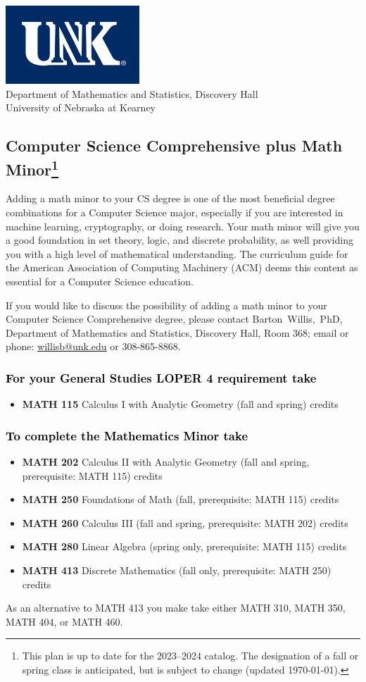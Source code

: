 \documentclass[10pt]{article}
\makeatletter
\newenvironment{mypar}[2]
   {\begin{list}{}%
     {\setlength\leftmargin{#1}
     \setlength\rightmargin{#2}}
     \item[]}
   {\end{list}}
\newcommand{\calcone}{\textbf{MATH 115} Calculus I with Analytic Geometry (fall and spring) \dotfill 5 credits}
\newcommand{\calctwo}{\textbf{MATH 202} Calculus II with Analytic Geometry (fall and spring, prerequisite: MATH 115) \dotfill 5 credits }
\newcommand{\foundations}{\textbf{MATH 250} Foundations of Math (fall, prerequisite: MATH 115)  \dotfill 3 credits}
\newcommand{\calcthree}{\textbf{MATH 260} Calculus III  (fall and spring, prerequisite: MATH 202) \dotfill 5 credits}
\newcommand{\linear}{\textbf{MATH 280} Linear Algebra (spring only, prerequisite: MATH 115) \dotfill 3 credits}
\newcommand{\discrete}{\textbf{MATH 413} Discrete Mathematics  (fall only, prerequisite: MATH 250)\dotfill 3 credits}
\newcommand{\discreteshort}{MATH 413}
\newcommand{\abstractalgebrashort}{MATH 350}
\newcommand{\advancedcalcshort}{MATH 460}
\newcommand{\collegegeometryshort}{MATH 310}
\newcommand{\numbertheoryshort}{MATH 404}
\newcommand{\contactbw}{\mbox{Barton Willis, PhD}, Department of Mathematics and Statistics,  Discovery Hall, Room 368;
email or phone: \href{mailto:willisb@unk.edu}{willisb@unk.edu} or 308-865-8868.}
\newcommand{\forinfo}[2]{If you would like to discuss the possibility of adding a math {#1} to your {#2}, please contact \contactbw}
\newcommand{\catalog}{2023--2024 }
\newcommand{\LOPER}{LOPER\xspace}
\newcommand{\myfootnote}{\footnote{This plan is up to date for  the \catalog catalog. The designation of a fall or spring class is 
anticipated, but  is subject to change (updated \today).}}
\newcommand{\myheading}{
\begin{flushleft}
\includegraphics[scale=0.35]{unk-logo}\\
\setcounter{footnote}{0}
\vspace{0.25in}
 \textcolor{unkblue}{Department of Mathematics and Statistics, Discovery Hall} \\
  \textcolor{unkblue}{University of Nebraska at Kearney}
\end{flushleft}}
\makeatother
\begin{document}
\myheading


\subsection*{\textbf{\textcolor{unkblue}{Computer Science Comprehensive plus Math Minor\myfootnote}}}


Adding a math minor to your CS degree is one of the most beneficial degree 
combinations for a Computer Science major, especially if you are interested 
in machine learning, cryptography,  or doing research.  Your math minor will 
give you a good foundation in set theory, logic, and discrete probability, 
as well providing you with a high level of mathematical understanding. 
The curriculum guide for the American Association of Computing Machinery (ACM) 
deems  this content  as essential for  a Computer Science education.

\forinfo{minor}{Computer Science Comprehensive degree}

\vspace{-0.1in}

\subsubsection*{\textcolor{black}{For  your General Studies \LOPER 4 requirement take}}
\begin{itemize}
\item  \calcone
\end{itemize}

\subsubsection*{\textcolor{black}{To complete the Mathematics Minor  take}}
\begin{itemize}
\item \calctwo
\item \foundations
\item \calcthree
\item \linear
\item \discrete
\end{itemize}
\vspace{-0.1in}
\begin{mypar}{0.5cm}{0.5cm}
As an alternative to  \discreteshort{} you make take either 
\collegegeometryshort, \abstractalgebrashort, \numbertheoryshort, or \advancedcalcshort.
\end{mypar}

\vspace{-0.1in}
\end{document}
